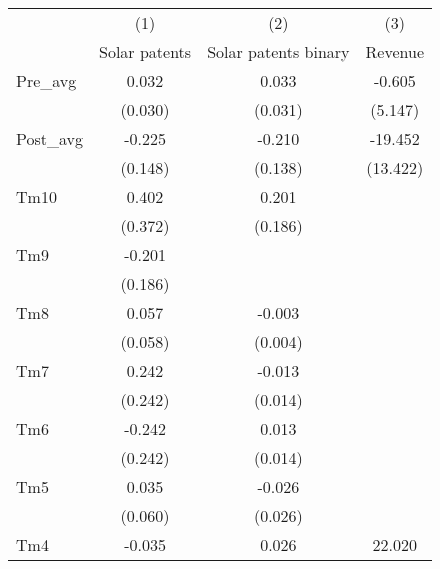 {
\def\sym#1{\ifmmode^{#1}\else\(^{#1}\)\fi}
\begin{tabular}{l*{3}{c}}
\hline\hline
                    &\multicolumn{1}{c}{(1)}&\multicolumn{1}{c}{(2)}&\multicolumn{1}{c}{(3)}\\
                    &\multicolumn{1}{c}{Solar patents}&\multicolumn{1}{c}{Solar patents binary}&\multicolumn{1}{c}{Revenue}\\
\hline
Pre\_avg             &       0.032         &       0.033         &      -0.605         \\
                    &     (0.030)         &     (0.031)         &     (5.147)         \\
[1em]
Post\_avg            &      -0.225         &      -0.210         &     -19.452         \\
                    &     (0.148)         &     (0.138)         &    (13.422)         \\
[1em]
Tm10                &       0.402         &       0.201         &                     \\
                    &     (0.372)         &     (0.186)         &                     \\
[1em]
Tm9                 &      -0.201         &                     &                     \\
                    &     (0.186)         &                     &                     \\
[1em]
Tm8                 &       0.057         &      -0.003         &                     \\
                    &     (0.058)         &     (0.004)         &                     \\
[1em]
Tm7                 &       0.242         &      -0.013         &                     \\
                    &     (0.242)         &     (0.014)         &                     \\
[1em]
Tm6                 &      -0.242         &       0.013         &                     \\
                    &     (0.242)         &     (0.014)         &                     \\
[1em]
Tm5                 &       0.035         &      -0.026         &                     \\
                    &     (0.060)         &     (0.026)         &                     \\
[1em]
Tm4                 &      -0.035         &       0.026         &      22.020         \\

\end{tabular}}
